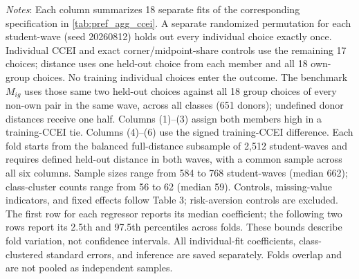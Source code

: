 \documentclass[11 pt]{article}
\begin{document}
\begin{table}[H]
\centering
\caption{Leave-One-Choice-Out Validation}
\label{tab:disjoint_choice}

\begin{minipage}{\textwidth}
{\footnotesize \emph{Notes}: Each column summarizes 18 separate fits of the corresponding specification in \autoref{tab:pref_agg_ccei}. A separate randomized permutation for each student-wave (seed 20260812) holds out every individual choice exactly once. Individual CCEI and exact corner/midpoint-share controls use the remaining 17 choices; distance uses one held-out choice from each member and all 18 own-group choices. No training individual choices enter the outcome. The benchmark $M_{ig}$ uses those same two held-out choices against all 18 group choices of every non-own pair in the same wave, across all classes (651 donors); undefined donor distances receive one half. Columns (1)--(3) assign both members high in a training-CCEI tie. Columns (4)--(6) use the signed training-CCEI difference. Each fold starts from the balanced full-distance subsample of 2,512 student-waves and requires defined held-out distance in both waves, with a common sample across all six columns. Sample sizes range from 584 to 768 student-waves (median 662); class-cluster counts range from 56 to 62 (median 59). Controls, missing-value indicators, and fixed effects follow Table 3; risk-aversion controls are excluded. The first row for each regressor reports its median coefficient; the following two rows report its 2.5th and 97.5th percentiles across folds. These bounds describe fold variation, not confidence intervals. All individual-fit coefficients, class-clustered standard errors, and inference are saved separately. Folds overlap and are not pooled as independent samples.}
\end{minipage}
\end{table}
\end{document}
